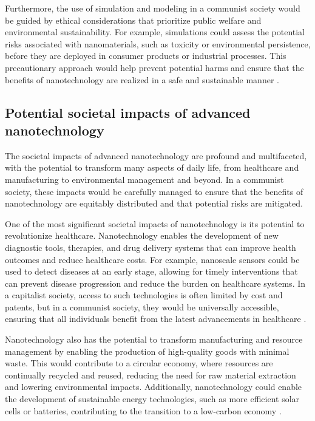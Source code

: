 Furthermore, the use of simulation and modeling in a communist society would be guided by ethical considerations that prioritize public welfare and environmental sustainability. For example, simulations could assess the potential risks associated with nanomaterials, such as toxicity or environmental persistence, before they are deployed in consumer products or industrial processes. This precautionary approach would help prevent potential harms and ensure that the benefits of nanotechnology are realized in a safe and sustainable manner \cite[pp.~335-342]{freitas1999nanomedicine}.

\subsection{Potential societal impacts of advanced nanotechnology}

The societal impacts of advanced nanotechnology are profound and multifaceted, with the potential to transform many aspects of daily life, from healthcare and manufacturing to environmental management and beyond. In a communist society, these impacts would be carefully managed to ensure that the benefits of nanotechnology are equitably distributed and that potential risks are mitigated.

One of the most significant societal impacts of nanotechnology is its potential to revolutionize healthcare. Nanotechnology enables the development of new diagnostic tools, therapies, and drug delivery systems that can improve health outcomes and reduce healthcare costs. For example, nanoscale sensors could be used to detect diseases at an early stage, allowing for timely interventions that can prevent disease progression and reduce the burden on healthcare systems. In a capitalist society, access to such technologies is often limited by cost and patents, but in a communist society, they would be universally accessible, ensuring that all individuals benefit from the latest advancements in healthcare \cite[pp.~205-212]{drexler1986engines}.

Nanotechnology also has the potential to transform manufacturing and resource management by enabling the production of high-quality goods with minimal waste. This would contribute to a circular economy, where resources are continually recycled and reused, reducing the need for raw material extraction and lowering environmental impacts. Additionally, nanotechnology could enable the development of sustainable energy technologies, such as more efficient solar cells or batteries, contributing to the transition to a low-carbon economy \cite[pp.~315-322]{meyer2004nanotechnology}.

